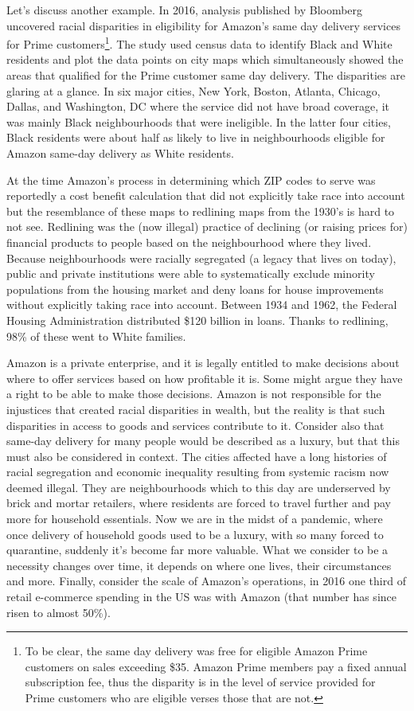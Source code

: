 Let's discuss another example. In 2016, analysis published by Bloomberg uncovered racial disparities in eligibility for Amazon's same day delivery services for Prime customers\footnote{To be clear, the same day delivery was free for eligible Amazon Prime customers on sales exceeding \$35. Amazon Prime members pay a fixed annual subscription fee, thus the disparity is in the level of service provided for Prime customers who are eligible verses those that are not.}\cite{AmazonSameDayPrime}. The study used census data to identify Black and White residents and plot the data points on city maps which simultaneously showed the areas that qualified for the Prime customer same day delivery. The disparities are glaring at a glance. In six major cities, New York, Boston, Atlanta, Chicago, Dallas, and Washington, DC  where the service did not have broad coverage, it was mainly Black neighbourhoods that were ineligible. In the latter four cities, Black residents were about half as likely to live in neighbourhoods eligible for Amazon same-day delivery as White residents.

At the time Amazon's process in determining which ZIP codes to serve was reportedly a cost benefit calculation that did not explicitly take race into account but the resemblance of these maps to redlining maps from the 1930's is hard to not see. Redlining was the (now illegal) practice of declining (or raising prices for) financial products to people based on the neighbourhood where they lived. Because neighbourhoods were racially segregated (a legacy that lives on today), public and private institutions were able to systematically exclude minority populations from the housing market and deny loans for house improvements without explicitly taking race into account. Between 1934 and 1962, the Federal Housing Administration distributed \$120 billion in loans. Thanks to redlining, 98\% of these went to White families.

Amazon is a private enterprise, and it is legally entitled to make decisions about where to offer services based on how profitable it is. Some might argue they have a right to be able to make those decisions. Amazon is not responsible for the injustices that created racial disparities in wealth, but the reality is that such disparities in access to goods and services contribute to it. Consider also that same-day delivery for many people would be described as a luxury, but that this must also be considered in context. The cities affected have a long histories of racial segregation and economic inequality resulting from systemic racism now deemed illegal. They are neighbourhoods which to this day are underserved by brick and mortar retailers, where residents are forced to travel further and pay more for household essentials. Now we are in the midst of a pandemic, where once delivery of household goods used to be a luxury, with so many forced to quarantine, suddenly it's become far more valuable. What we consider to be a necessity changes over time, it depends on where one lives, their circumstances and more. Finally, consider the scale of Amazon's operations, in 2016 one third of retail e-commerce spending in the US was with Amazon (that number has since risen to almost 50\%). 


